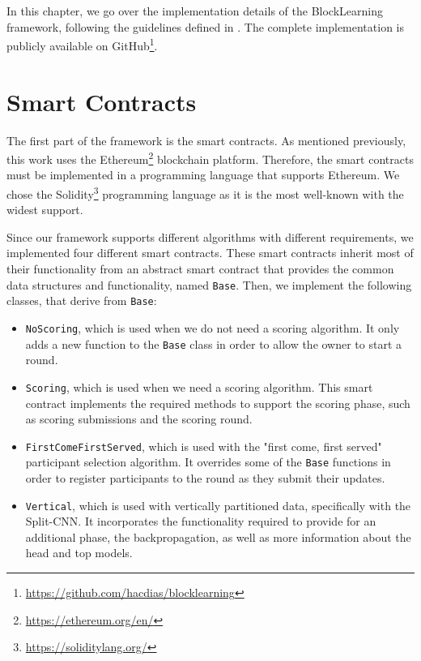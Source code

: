 In this chapter, we go over the implementation details of the BlockLearning framework, following the guidelines defined in . The complete implementation is publicly available on GitHub\footnote{\url{https://github.com/hacdias/blocklearning}}.

\section{Smart Contracts}

The first part of the framework is the smart contracts. As mentioned previously, this work uses the Ethereum\footnote{\url{https://ethereum.org/en/}} blockchain platform. Therefore, the smart contracts must be implemented in a programming language that supports Ethereum. We chose the Solidity\footnote{\url{https://soliditylang.org/}} programming language as it is the most well-known with the widest support.

Since our framework supports different algorithms with different requirements, we implemented four different smart contracts. These smart contracts inherit most of their functionality from an abstract smart contract that provides the common data structures and functionality, named \texttt{Base}. Then, we implement the following classes, that derive from \texttt{Base}:

\begin{itemize}
    \item \texttt{NoScoring}, which is used when we do not need a scoring algorithm. It only adds a new function to the \texttt{Base} class in order to allow the owner to start a round.
    
    \item \texttt{Scoring}, which is used when we need a scoring algorithm. This smart contract implements the required methods to support the scoring phase, such as scoring submissions and the scoring round.
    
    \item \texttt{FirstComeFirstServed}, which is used with the "first come, first served" participant selection algorithm. It overrides some of the \texttt{Base} functions in order to register participants to the round as they submit their updates.
    
    \item \texttt{Vertical}, which is used with vertically partitioned data, specifically with the Split-CNN. It incorporates the functionality required to provide for an additional phase, the backpropagation, as well as more information about the head and top models.
\end{itemize}

